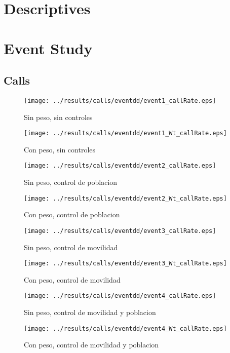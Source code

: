 \documentclass[11pt,letterpaper]{article}
\begin{document}
\section{Descriptives}

\section{Event Study}
	\subsection{Calls}
\begin{figure}[H]
\caption{Sin peso, sin controles}
\centering
\texttt{[image: ../results/calls/eventdd/event1\_callRate.eps]}
\end{figure}

\begin{figure}[H]
\caption{Con peso, sin controles}
\centering
\texttt{[image: ../results/calls/eventdd/event1\_Wt\_callRate.eps]}
\end{figure}
\begin{figure}[H]
\caption{Sin peso, control de poblacion}
\centering
\texttt{[image: ../results/calls/eventdd/event2\_callRate.eps]}
\end{figure}

\begin{figure}[H]
\caption{Con peso, control de poblacion}
\centering
\texttt{[image: ../results/calls/eventdd/event2\_Wt\_callRate.eps]}
\end{figure}
\begin{figure}[H]
\caption{Sin peso, control de movilidad}
\centering
\texttt{[image: ../results/calls/eventdd/event3\_callRate.eps]}
\end{figure}

\begin{figure}[H]
\caption{Con peso, control de movilidad}
\centering
\texttt{[image: ../results/calls/eventdd/event3\_Wt\_callRate.eps]}
\end{figure}
\begin{figure}[H]
\caption{Sin peso, control de movilidad y poblacion}
\centering
\texttt{[image: ../results/calls/eventdd/event4\_callRate.eps]}
\end{figure}

\begin{figure}[H]
\caption{Con peso, control de movilidad y poblacion}
\centering
\texttt{[image: ../results/calls/eventdd/event4\_Wt\_callRate.eps]}
\end{figure}
\end{document}
